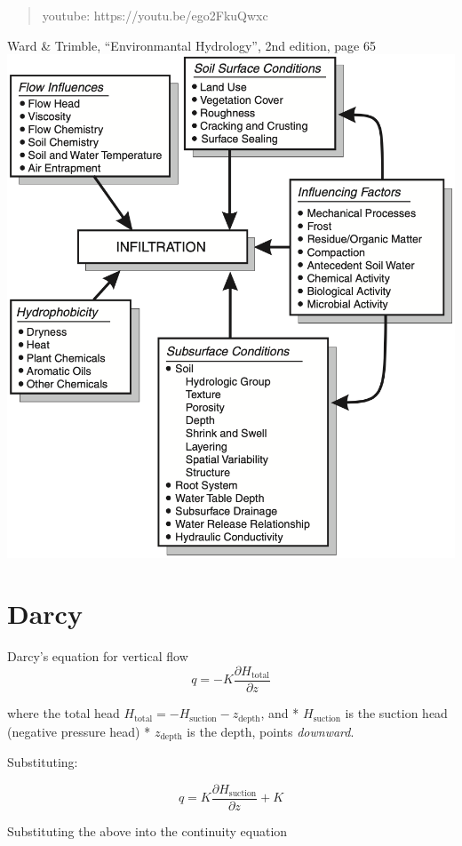 \documentclass[
  letterpaper,
  DIV=11,
  numbers=noendperiod]{scrreprt}
\begin{document}
\begin{quote}
youtube: https://youtu.be/ego2FkuQwxc
\end{quote}

Ward \& Trimble, ``Environmantal Hydrology'', 2nd edition, page 65
\includegraphics{archive/figures/ward-and-trimble-figure3.17-page65.png}

\hypertarget{darcy}{%
\section{Darcy}\label{darcy}}

Darcy's equation for vertical flow \[
q = -K \frac{\partial H_\text{total}}{\partial z}
\]

where the total head
\(H_\text{total}=-H_\text{suction}-z_\text{depth}\), and *
\(H_\text{suction}\) is the suction head (negative pressure head) *
\(z_\text{depth}\) is the depth, points \emph{downward}.

Substituting:

\[
q = K \frac{\partial H_\text{suction}}{\partial z} + K
\]

Substituting the above into the continuity equation
\end{document}
